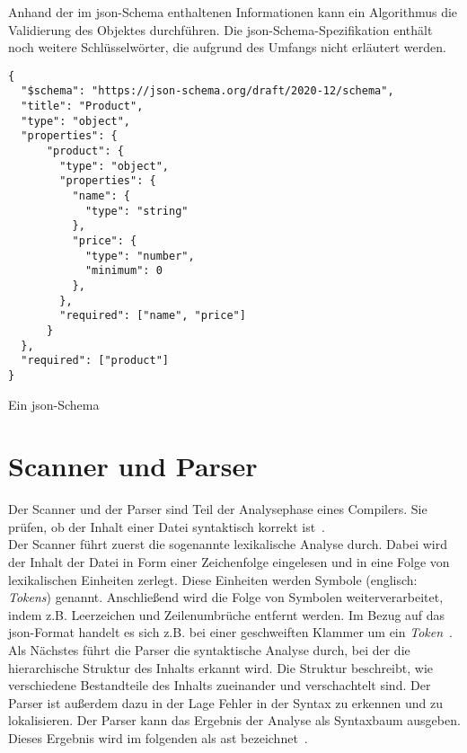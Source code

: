 Anhand der im \acs{json}-Schema enthaltenen Informationen kann ein Algorithmus die Validierung des Objektes durchführen.
Die \acs{json}-Schema-Spezifikation enthält noch weitere Schlüsselwörter, die aufgrund des Umfangs nicht erläutert werden.

\begin{listing}[htp]
      \begin{verbatim}
{
  "$schema": "https://json-schema.org/draft/2020-12/schema",
  "title": "Product",
  "type": "object",
  "properties": {
      "product": {
        "type": "object",
        "properties": {
          "name": {
            "type": "string"
          },
          "price": {
            "type": "number", 
            "minimum": 0
          },
        },
        "required": ["name", "price"]
      }
  },
  "required": ["product"]
}
      \end{verbatim}
      \caption{Ein \acs{json}-Schema}
      \label{lst:json-schema}
\end{listing}

\section{Scanner und Parser}\label{sec:parser}

Der Scanner und der Parser sind Teil der Analysephase eines Compilers. Sie prüfen, ob der Inhalt einer Datei syntaktisch korrekt ist~\cite{SommerGumm+2019+113+148}.
\\
Der Scanner führt zuerst die sogenannte lexikalische Analyse durch. Dabei wird der Inhalt der Datei in Form einer
Zeichenfolge eingelesen und in eine Folge von lexikalischen Einheiten zerlegt.
Diese Einheiten werden Symbole (englisch: \textit{Tokens}) genannt.
Anschließend wird die Folge von Symbolen weiterverarbeitet, indem z.B. Leerzeichen und Zeilenumbrüche entfernt werden.
Im Bezug auf das \ac{json}-Format handelt es sich z.B. bei einer geschweiften Klammer um ein \textit{Token}~\cite{syntax-analysis}.
\\
Als Nächstes führt die Parser die syntaktische Analyse durch, bei der die hierarchische Struktur des Inhalts erkannt wird.
Die Struktur beschreibt, wie verschiedene Bestandteile des Inhalts zueinander und verschachtelt sind.
Der Parser ist außerdem dazu in der Lage Fehler in der Syntax zu erkennen und zu lokalisieren.
Der Parser kann das Ergebnis der Analyse als Syntaxbaum ausgeben. Dieses Ergebnis wird im folgenden als \ac{ast} bezeichnet~\cite{syntax-analysis}.
